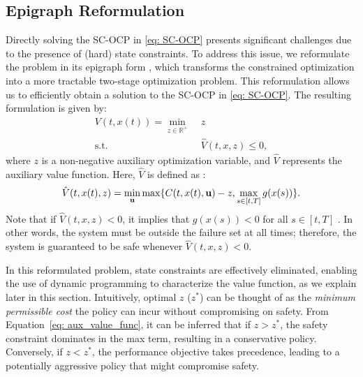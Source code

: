 \subsection{Epigraph Reformulation}\label{subsec: epigraph}
Directly solving the SC-OCP in \eqref{eq: SC-OCP} presents significant challenges due to the presence of (hard) state constraints. To address this issue, we reformulate the problem in its epigraph form \cite{boyd2004convex}, which transforms the constrained optimization into a more tractable two-stage optimization problem. This reformulation allows us to efficiently obtain a solution to the SC-OCP in \eqref{eq: SC-OCP}. The resulting formulation is given by:
\begin{equation}\label{eq: aux_value_func}
    \begin{aligned}
    V(t, x(t)) = \min_{z \in \mathbb{R^+}} & \; z  \\
    \text{s.t.} & \; \hat{V}(t, x, z) \leq 0,
\end{aligned}
\end{equation}
where $z$ is a non-negative auxiliary optimization variable, and $\hat{V}$ represents the auxiliary value function. Here, $\hat{V}$ is defined as \cite{altarovici2013general}:
% 
\begin{equation}\label{eq: aux_vfunc_def}
\begin{aligned}
    \hat{V}(t, x(t), z) = \min_{\mathbf{u}} \max \{C(t, x(t), \mathbf{u}) -z, \max_{s \in [t, T]}g(x(s)) \}.
\end{aligned}
\end{equation}
% 
Note that if $\hat{V}(t, x, z) < 0$, it implies that $g(x(s)) < 0$ for all $s \in [t, T]$ . In other words, the system must be outside the failure set at all times; therefore, the system is guaranteed to be safe whenever $\hat{V}(t, x, z) < 0$.

In this reformulated problem, state constraints are effectively eliminated, enabling the use of dynamic programming to characterize the value function, as we explain later in this section. Intuitively, optimal $z$ ($z^*$) can be thought of as the \textit{minimum permissible cost} the policy can incur without compromising on safety. From Equation~\ref{eq: aux_value_func}, it can be inferred that if $z > z^*$, the safety constraint dominates in the max term, resulting in a conservative policy. Conversely, if $z < z^*$, the performance objective takes precedence, leading to a potentially aggressive policy that might compromise safety.

